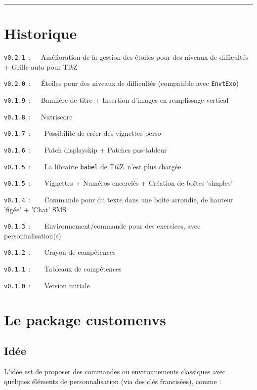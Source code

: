 \documentclass[french,11pt,a4paper]{article}
\providecommand\tikzlogo{Ti\textit{k}Z}
\let\TikZ\tikzlogo
\begin{document}
\tableofcontents

\vspace*{5mm}

\hrule

\pagebreak

\section{Historique}

\verb|v0.2.1|~:~~~Amélioration de la gestion des étoiles pour des niveaux de difficultés + Grille auto pour \TikZ\

\verb|v0.2.0|~:~~~Étoiles pour des niveaux de difficultés (compatible avec \texttt{EnvtExo})

\verb|v0.1.9|~:~~~Bannière de titre + Insertion d'images en remplissage vertical

\verb|v0.1.8|~:~~~Nutriscore

\verb|v0.1.7|~:~~~~Possibilité de créer des vignettes \textsf{perso}

\verb|v0.1.6|~:~~~~Patch \textsf{displayskip} + Patches \textsf{pas-tableur}

\verb|v0.1.5|~:~~~~La librairie \texttt{babel} de \TikZ\ n'est plus chargée

\verb|v0.1.5|~:~~~~Vignettes + Numéros encerclés + Création de boîtes 'simples'

\verb|v0.1.4|~:~~~~Commande pour du texte dans une boîte arrondie, de hauteur 'figée' + 'Chat' SMS

\verb|v0.1.3|~:~~~~Environnement/commande pour des exercices, avec personnalisation(s)

\verb|v0.1.2|~:~~~~Crayon de compétences

\verb|v0.1.1|~:~~~~Tableaux de compétences

\verb|v0.1.0|~:~~~~Version initiale

\pagebreak

\section{Le package customenvs}

\subsection{Idée}

L'idée est de proposer des commandes ou environnements classiques avec quelques éléments de personnalisation (via des \textsf{clés} francisées), comme :
\end{document}
